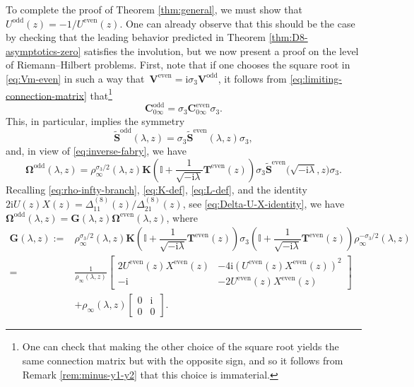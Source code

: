 \documentclass[11pt]{article}
\numberwithin{equation}{section}
\numberwithin{equation}{section}
\newcommand{\ii}{\mathrm{i}}
\begin{document}
To complete the proof of Theorem \ref{thm:general}, we must show that $U^{\mathrm{odd}}(z) = -1/U^{\mathrm{even}}(z)$. One can already observe that this should be the case by checking that the leading behavior predicted in Theorem \ref{thm:D8-asymptotics-zero} satisfies the involution, but we now present a proof on the level of Riemann--Hilbert problems. First, note that if one chooses the square root in \eqref{eq:Vm-even} in such a way that~$\mathbf{V}^\mathrm{even} = \ii \sigma_3 \mathbf{V}^\mathrm{odd}$, it follows from \eqref{eq:limiting-connection-matrix} that\footnote{One can check that making the other choice of the square root yields the same connection matrix but with the opposite sign, and so it follows from Remark \ref{rem:minus-y1-y2} that this choice is immaterial.}
\[
 \mathbf{C}_{0\infty}^{\mathrm{odd}} = \sigma_3 \mathbf{C}^{\mathrm{even}}_{0 \infty} \sigma_3.
\]
This, in particular, implies the symmetry
\[
\widetilde{\mathbf{S}}^{\mathrm{odd}}(\lambda, z) = \sigma_3 \widetilde{\mathbf{S}}^{\mathrm{even}}(\lambda, z) \sigma_3,
\]
and, in view of \eqref{eq:inverse-fabry}, we have
\begin{equation}
 \mathbf{\Omega}^{\mathrm{odd}}(\lambda, z) = \rho_\infty^{\sigma_3/2}(\lambda, z) \mathbf{K}\left( \mathbb{I} + \dfrac{1}{\sqrt{-\ii \lambda}} \mathbf{T}^{\mathrm{even}}(z) \right) \sigma_3 \widetilde{\mathbf{S}}^{\mathrm{even}}\big(\sqrt{-\ii \lambda}, z\big) \sigma_3.
 \label{eq:Omega-even-odd}
\end{equation}
Recalling \eqref{eq:rho-infty-branch}, \eqref{eq:K-def}, \eqref{eq:L-def}, and the identity $2\ii U(z)X(z) = \Delta^{(8)}_{11}(z)/\Delta^{(8)}_{21}(z)$, see \eqref{eq:Delta-U-X-identity}, we have~$\mathbf{\Omega}^{\mathrm{odd}}(\lambda, z) = \mathbf{G}(\lambda, z) \mathbf{\Omega}^{\mathrm{even}}(\lambda, z)$, where
\begin{align}
\mathbf{G}(\lambda, z):={}& \rho_\infty^{\sigma_3/2}(\lambda, z) \mathbf{K}\left( \mathbb{I} + \dfrac{1}{\sqrt{-\ii \lambda}} \mathbf{T}^{\mathrm{even}}(z) \right) \sigma_3 \left( \mathbb{I} + \dfrac{1}{\sqrt{-\ii \lambda}} \mathbf{T}^{\mathrm{even}}(z) \right) \rho_\infty^{-\sigma_3/2}(\lambda, z) \nonumber\\
={}& \frac{1}{\rho_\infty(\lambda, z)}\begin{bmatrix} 2U^{\mathrm{even}}(z)X^{\mathrm{even}}(z) & -4\ii (U^{\mathrm{even}}(z) X^{\mathrm{even}}(z))^2 \\ -\ii & -2U^{\mathrm{even}}(z)X^{\mathrm{even}}(z) \end{bmatrix}\nonumber\\
& + \rho_\infty(\lambda, z) \begin{bmatrix}
 0 & \ii \\ 0 & 0
\end{bmatrix}.\label{eq:G-def}
\end{align}
\end{document}
